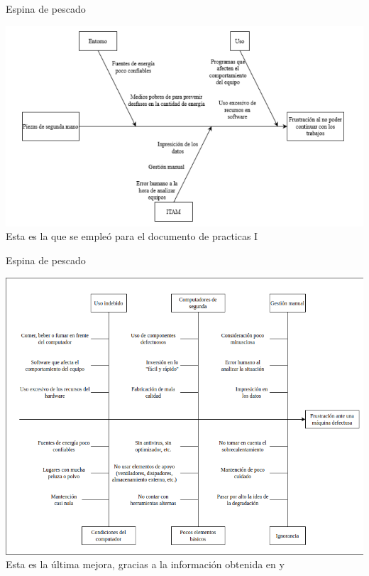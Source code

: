 \begin{frame}{Espina de pescado}
    \begin{center}
        \includegraphics[width=.9\textheight]{./pictures/ishikawa_1.png} \\
        Esta es la que se empleó para el documento de practicas I
    \end{center}
\end{frame}
\begin{frame}{Espina de pescado}
    \begin{center}
        \includegraphics[width=.9\textheight]{./pictures/ishikawa_2.png}\break
        Esta es la última mejora, gracias a la información obtenida
        en \textcite{pcmag} y \textcite{computerhoy}
    \end{center}
\end{frame}
